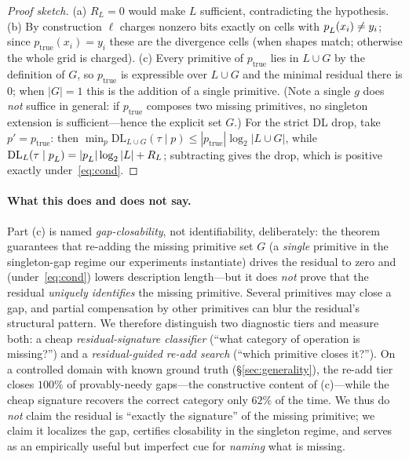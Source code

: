 \begin{proof}[Proof sketch]
(a) $R_L=0$ would make $L$ sufficient, contradicting the hypothesis. (b) By construction $\ell$ charges
nonzero bits exactly on cells with $p^{\*}_L(x_i)\neq y_i$; since $p_{\mathrm{true}}(x_i)=y_i$ these are the
divergence cells (when shapes match; otherwise the whole grid is charged). (c) Every primitive of
$p_{\mathrm{true}}$ lies in $L\cup G$ by the definition of $G$, so $p_{\mathrm{true}}$ is expressible over
$L\cup G$ and the minimal residual there is $0$; when $|G|=1$ this is the addition of a single primitive.
(Note a single $g$ does \emph{not} suffice in general: if $p_{\mathrm{true}}$ composes two missing
primitives, no singleton extension is sufficient---hence the explicit set $G$.) For the strict DL drop, take
$p'=p_{\mathrm{true}}$: then $\min_p\mathrm{DL}_{L\cup G}(\tau\mid p)\le|p_{\mathrm{true}}|\log_2|L\cup G|$,
while $\mathrm{DL}_L(\tau\mid p^{\*}_L)=|p^{\*}_L|\log_2|L|+R_L$; subtracting gives the drop, which is positive
exactly under~\eqref{eq:cond}.
\end{proof}

\paragraph{What this does and does not say.} Part (c) is named \emph{gap-closability}, not identifiability,
deliberately: the theorem guarantees that re-adding the missing primitive set $G$ (a \emph{single} primitive
in the singleton-gap regime our experiments instantiate) drives the residual to zero and
(under~\eqref{eq:cond}) lowers description length---but it does \emph{not} prove that the residual
\emph{uniquely identifies} the missing primitive. Several primitives may close a gap, and partial compensation by other
primitives can blur the residual's structural pattern. We therefore distinguish two diagnostic tiers and
measure both: a cheap \emph{residual-signature classifier} (``what category of operation is missing?'') and a
\emph{residual-guided re-add search} (``which primitive closes it?''). On a controlled domain with known ground
truth (\S\ref{sec:generality}), the re-add tier closes $100\%$ of provably-needy gaps---the constructive
content of (c)---while the cheap signature recovers the correct category only $62\%$ of the time. We thus do
\emph{not} claim the residual is ``exactly the signature'' of the missing primitive; we claim it localizes the
gap, certifies closability in the singleton regime, and serves as an empirically useful but imperfect cue for
\emph{naming} what is missing.
